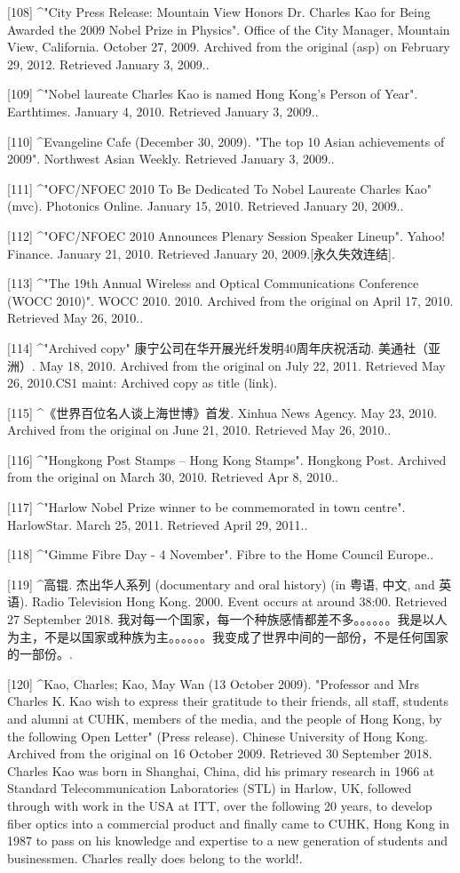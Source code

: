[108]
^"City Press Release: Mountain View Honors Dr. Charles Kao for Being Awarded the 2009 Nobel Prize in Physics". Office of the City Manager, Mountain View, California. October 27, 2009. Archived from the original (asp) on February 29, 2012. Retrieved January 3, 2009..

[109]
^"Nobel laureate Charles Kao is named Hong Kong's Person of Year". Earthtimes. January 4, 2010. Retrieved January 3, 2009..

[110]
^Evangeline Cafe (December 30, 2009). "The top 10 Asian achievements of 2009". Northwest Asian Weekly. Retrieved January 3, 2009..

[111]
^"OFC/NFOEC 2010 To Be Dedicated To Nobel Laureate Charles Kao" (mvc). Photonics Online. January 15, 2010. Retrieved January 20, 2009..

[112]
^"OFC/NFOEC 2010 Announces Plenary Session Speaker Lineup". Yahoo! Finance. January 21, 2010. Retrieved January 20, 2009.[永久失效连结].

[113]
^"The 19th Annual Wireless and Optical Communications Conference (WOCC 2010)". WOCC 2010. 2010. Archived from the original on April 17, 2010. Retrieved May 26, 2010..

[114]
^"Archived copy" 康宁公司在华开展光纤发明40周年庆祝活动. 美通社（亚洲）. May 18, 2010. Archived from the original on July 22, 2011. Retrieved May 26, 2010.CS1 maint: Archived copy as title (link).

[115]
^《世界百位名人谈上海世博》首发. Xinhua News Agency. May 23, 2010. Archived from the original on June 21, 2010. Retrieved May 26, 2010..

[116]
^"Hongkong Post Stamps – Hong Kong Stamps". Hongkong Post. Archived from the original on March 30, 2010. Retrieved Apr 8, 2010..

[117]
^"Harlow Nobel Prize winner to be commemorated in town centre". HarlowStar. March 25, 2011. Retrieved April 29, 2011..

[118]
^"Gimme Fibre Day - 4 November". Fibre to the Home Council Europe..

[119]
^高锟. 杰出华人系列 (documentary and oral history) (in 粤语, 中文, and 英语). Radio Television Hong Kong. 2000. Event occurs at around 38:00. Retrieved 27 September 2018. 我对每一个国家，每一个种族感情都差不多。。。。。。我是以人为主，不是以国家或种族为主。。。。。。我变成了世界中间的一部份，不是任何国家的一部份。.

[120]
^Kao, Charles; Kao, May Wan (13 October 2009). "Professor and Mrs Charles K. Kao wish to express their gratitude to their friends, all staff, students and alumni at CUHK, members of the media, and the people of Hong Kong, by the following Open Letter" (Press release). Chinese University of Hong Kong. Archived from the original on 16 October 2009. Retrieved 30 September 2018. Charles Kao was born in Shanghai, China, did his primary research in 1966 at Standard Telecommunication Laboratories (STL) in Harlow, UK, followed through with work in the USA at ITT, over the following 20 years, to develop fiber optics into a commercial product and finally came to CUHK, Hong Kong in 1987 to pass on his knowledge and expertise to a new generation of students and businessmen. Charles really does belong to the world!.

